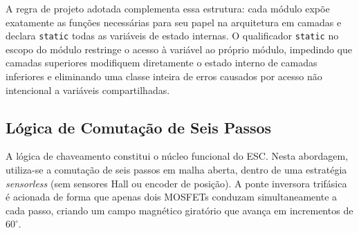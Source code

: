 A regra de projeto adotada complementa essa estrutura: cada módulo expõe exatamente as funções necessárias para seu papel na arquitetura em camadas e declara \texttt{static} todas as variáveis de estado internas. O qualificador \texttt{static} no escopo do módulo restringe o acesso à variável ao próprio módulo, impedindo que camadas superiores modifiquem diretamente o estado interno de camadas inferiores e eliminando uma classe inteira de erros causados por acesso não intencional a variáveis compartilhadas.

\subsection{Lógica de Comutação de Seis Passos}
A lógica de chaveamento constitui o núcleo funcional do ESC. Nesta abordagem, utiliza-se a comutação de seis passos em malha aberta, dentro de uma estratégia \textit{sensorless} (sem sensores Hall ou encoder de posição). A ponte inversora trifásica é acionada de forma que apenas dois MOSFETs conduzam simultaneamente a cada passo, criando um campo magnético giratório que avança em incrementos de $60^{\circ}$.

\begin{table}[H]
    \centering
    \caption{Sequência de Comutação de Seis Passos e Estado dos MOSFETs}
    \label{tab:logica_seis_passos}
\end{table}

